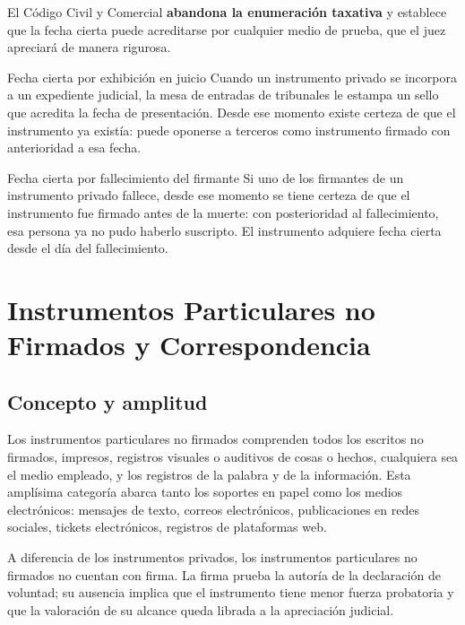 \documentclass[12pt,oneside]{book}
\begin{document}
El Código Civil y Comercial \textbf{abandona la enumeración taxativa} y establece que la fecha cierta puede acreditarse por cualquier medio de prueba, que el juez apreciará de manera rigurosa.

\begin{example}{Fecha cierta por exhibición en juicio}
Cuando un instrumento privado se incorpora a un expediente judicial, la mesa de entradas de tribunales le estampa un sello que acredita la fecha de presentación. Desde ese momento existe certeza de que el instrumento ya existía: puede oponerse a terceros como instrumento firmado con anterioridad a esa fecha.
\end{example}

\begin{example}{Fecha cierta por fallecimiento del firmante}
Si uno de los firmantes de un instrumento privado fallece, desde ese momento se tiene certeza de que el instrumento fue firmado antes de la muerte: con posterioridad al fallecimiento, esa persona ya no pudo haberlo suscripto. El instrumento adquiere fecha cierta desde el día del fallecimiento.
\end{example}

\chapter{Instrumentos Particulares no Firmados y Correspondencia}

\section{Concepto y amplitud}

Los instrumentos particulares no firmados comprenden todos los escritos no firmados, impresos, registros visuales o auditivos de cosas o hechos, cualquiera sea el medio empleado, y los registros de la palabra y de la información. Esta amplísima categoría abarca tanto los soportes en papel como los medios electrónicos: mensajes de texto, correos electrónicos, publicaciones en redes sociales, tickets electrónicos, registros de plataformas web.

\begin{note}
A diferencia de los instrumentos privados, los instrumentos particulares no firmados no cuentan con firma. La firma prueba la autoría de la declaración de voluntad; su ausencia implica que el instrumento tiene menor fuerza probatoria y que la valoración de su alcance queda librada a la apreciación judicial.
\end{note}
\end{document}
